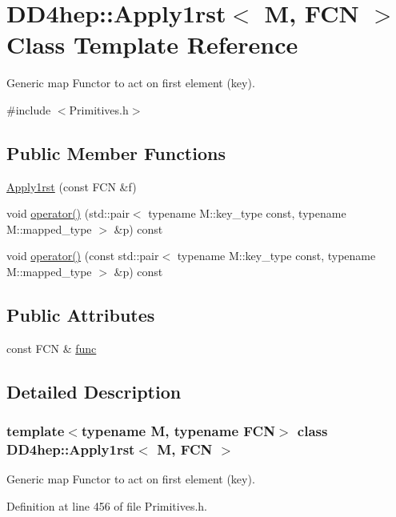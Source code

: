 \hypertarget{class_d_d4hep_1_1_apply1rst}{
\section{DD4hep::Apply1rst$<$ M, FCN $>$ Class Template Reference}
\label{class_d_d4hep_1_1_apply1rst}
}


Generic map Functor to act on first element (key).  


{\ttfamily \#include $<$Primitives.h$>$}\subsection*{Public Member Functions}
\begin{DoxyCompactItemize}
\item 
\hyperlink{class_d_d4hep_1_1_apply1rst_ace36b3412daa02454436d3a43abd5e63}{Apply1rst} (const FCN \&f)
\item 
void \hyperlink{class_d_d4hep_1_1_apply1rst_a6da5fbe07b79ad9bbe704722b2bcfd5d}{operator()} (std::pair$<$ typename M::key\_\-type const, typename M::mapped\_\-type $>$ \&p) const 
\item 
void \hyperlink{class_d_d4hep_1_1_apply1rst_a4d4ca3977250691bbbabfb6178880db2}{operator()} (const std::pair$<$ typename M::key\_\-type const, typename M::mapped\_\-type $>$ \&p) const 
\end{DoxyCompactItemize}
\subsection*{Public Attributes}
\begin{DoxyCompactItemize}
\item 
const FCN \& \hyperlink{class_d_d4hep_1_1_apply1rst_a3e6269941aac554118d47927dcdeba97}{func}
\end{DoxyCompactItemize}


\subsection{Detailed Description}
\subsubsection*{template$<$typename M, typename FCN$>$ class DD4hep::Apply1rst$<$ M, FCN $>$}

Generic map Functor to act on first element (key). 

Definition at line 456 of file Primitives.h.

